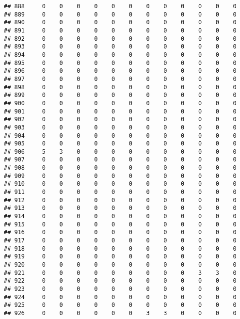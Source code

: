 \documentclass[]{article}
\begin{document}
\begin{verbatim}
## 888     0    0    0    0    0    0    0    0    0    0    0    0
## 889     0    0    0    0    0    0    0    0    0    0    0    0
## 890     0    0    0    0    0    0    0    0    0    0    0    0
## 891     0    0    0    0    0    0    0    0    0    0    0    0
## 892     0    0    0    0    0    0    0    0    0    0    0    0
## 893     0    0    0    0    0    0    0    0    0    0    0    0
## 894     0    0    0    0    0    0    0    0    0    0    0    0
## 895     0    0    0    0    0    0    0    0    0    0    0    0
## 896     0    0    0    0    0    0    0    0    0    0    0    0
## 897     0    0    0    0    0    0    0    0    0    0    0    0
## 898     0    0    0    0    0    0    0    0    0    0    0    0
## 899     0    0    0    0    0    0    0    0    0    0    0    0
## 900     0    0    0    0    0    0    0    0    0    0    0    0
## 901     0    0    0    0    0    0    0    0    0    0    0    0
## 902     0    0    0    0    0    0    0    0    0    0    0    0
## 903     0    0    0    0    0    0    0    0    0    0    0    0
## 904     0    0    0    0    0    0    0    0    0    0    0    0
## 905     0    0    0    0    0    0    0    0    0    0    0    0
## 906     5    3    0    0    0    0    0    0    0    0    0    0
## 907     0    0    0    0    0    0    0    0    0    0    0    0
## 908     0    0    0    0    0    0    0    0    0    0    0    0
## 909     0    0    0    0    0    0    0    0    0    0    0    0
## 910     0    0    0    0    0    0    0    0    0    0    0    0
## 911     0    0    0    0    0    0    0    0    0    0    0    0
## 912     0    0    0    0    0    0    0    0    0    0    0    0
## 913     0    0    0    0    0    0    0    0    0    0    0    0
## 914     0    0    0    0    0    0    0    0    0    0    0    0
## 915     0    0    0    0    0    0    0    0    0    0    0    0
## 916     0    0    0    0    0    0    0    0    0    0    0    0
## 917     0    0    0    0    0    0    0    0    0    0    0    0
## 918     0    0    0    0    0    0    0    0    0    0    0    0
## 919     0    0    0    0    0    0    0    0    0    0    0    0
## 920     0    0    0    0    0    0    0    0    0    0    0    0
## 921     0    0    0    0    0    0    0    0    0    3    3    0
## 922     0    0    0    0    0    0    0    0    0    0    0    0
## 923     0    0    0    0    0    0    0    0    0    0    0    0
## 924     0    0    0    0    0    0    0    0    0    0    0    0
## 925     0    0    0    0    0    0    0    0    0    0    0    0
## 926     0    0    0    0    0    0    3    3    0    0    0    0

\end{verbatim}
\end{document}
